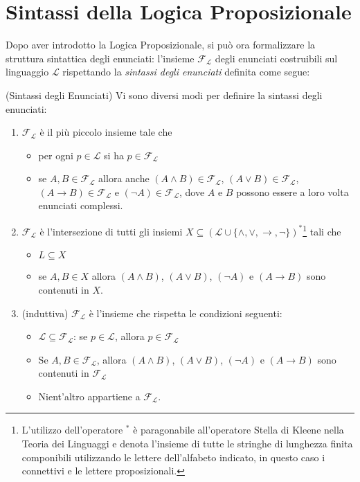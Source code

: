 \chapter{Sintassi della Logica Proposizionale}

Dopo aver introdotto la Logica Proposizionale, si può ora formalizzare la struttura sintattica degli enunciati: l'insieme $\mathscr{F}_\mathscr{L}$ degli enunciati costruibili sul linguaggio $\mathscr{L}$ rispettando la \textit{sintassi degli enunciati} definita come segue: 

\begin{defi}{(Sintassi degli Enunciati)}
Vi sono diversi modi per definire la sintassi degli enunciati:
\begin{enumerate}
  \setlength\itemsep{0pt}
 \item $\mathscr{F}_\mathscr{L}$ è il più piccolo insieme tale che 
    \begin{itemize}
      \item per ogni $p \in \mathscr{L}$ si ha $p \in \mathscr{F}_\mathscr{L}$
      \item se $A,B \in \mathscr{F}_\mathscr{L}$ allora anche $(A\land B) \in \mathscr{F}_\mathscr{L}$, $(A\lor B) \in \mathscr{F}_\mathscr{L}$, 
        $(A \rightarrow B) \in \mathscr{F}_\mathscr{L}$ e $(\neg A) \in \mathscr{F}_\mathscr{L}$, dove $A$ e $B$ possono 
        essere a loro volta enunciati complessi. 
      \end{itemize}
  \item $\mathscr{F}_\mathscr{L}$ è l'intersezione di tutti gli insiemi $X \subseteq (\mathscr{L} \cup \{\land, \lor, \rightarrow, \neg\})^*$\footnote{L'utilizzo dell'operatore $^*$ è paragonabile all'operatore Stella di Kleene nella Teoria dei Linguaggi e denota l'insieme di tutte le stringhe di lunghezza finita componibili utilizzando le lettere dell'alfabeto indicato, in questo caso i connettivi e le lettere proposizionali.} tali che 
    \begin{itemize}
      \item $L \subseteq X$
      \item se $A,B \in X$ allora $(A\land B)$, $(A\lor B)$, $(\neg A)$ e 
        $(A \rightarrow B)$ sono contenuti in $X$. 
    \end{itemize}
  \item (induttiva) $\mathscr{F}_\mathscr{L}$ è l'insieme che rispetta le condizioni seguenti: 
    \begin{itemize}
      \item $\mathscr{L} \subseteq \mathscr{F}_\mathscr{L}$: se $p \in \mathscr{L}$, allora $p \in \mathscr{F}_\mathscr{L}$
      \item Se $A,B \in \mathscr{F}_\mathscr{L}$, allora $(A\land B)$, $(A\lor B)$, $(\neg A)$ e 
        $(A \rightarrow B)$ sono contenuti in $\mathscr{F}_\mathscr{L}$
      \item Nient'altro appartiene a $\mathscr{F}_\mathscr{L}$.
    \end{itemize}
\end{enumerate}
\end{defi}
